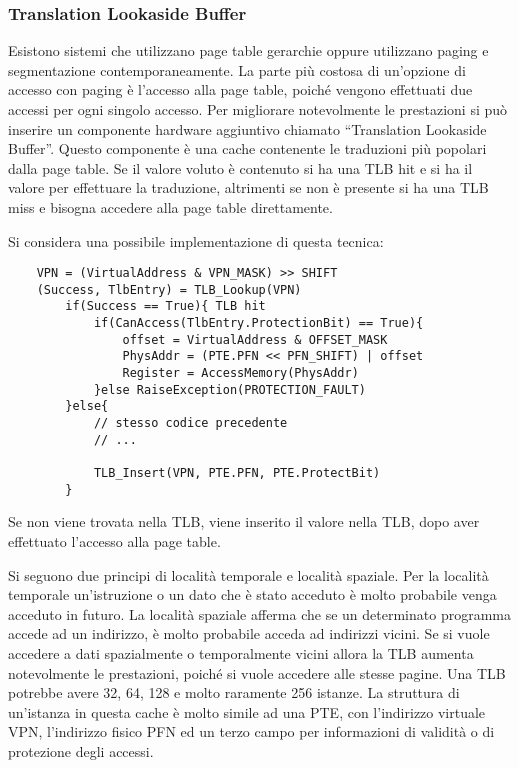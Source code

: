 \documentclass{article}
\numberwithin{equation}{subsection}
\begin{document}
\subsubsection{Translation Lookaside Buffer}

Esistono sistemi che utilizzano page table gerarchie oppure utilizzano paging e segmentazione contemporaneamente. 
La parte più costosa di un'opzione di accesso con paging è l'accesso alla page table, poiché vengono effettuati due accessi per ogni singolo accesso. 
Per migliorare notevolmente le prestazioni si può 
inserire un componente hardware aggiuntivo chiamato ``Translation Lookaside Buffer''. Questo componente è una cache contenente le traduzioni più popolari 
dalla page table. Se il valore voluto è contenuto si ha una TLB hit e si ha il valore per effettuare la traduzione, altrimenti se non è presente si ha una TLB miss 
e bisogna accedere alla page table direttamente. 


Si considera una possibile implementazione di questa tecnica: 
\begin{verbatim}
    VPN = (VirtualAddress & VPN_MASK) >> SHIFT
    (Success, TlbEntry) = TLB_Lookup(VPN)
        if(Success == True){ TLB hit
            if(CanAccess(TlbEntry.ProtectionBit) == True){
                offset = VirtualAddress & OFFSET_MASK
                PhysAddr = (PTE.PFN << PFN_SHIFT) | offset
                Register = AccessMemory(PhysAddr)
            }else RaiseException(PROTECTION_FAULT)
        }else{
            // stesso codice precedente
            // ...

            TLB_Insert(VPN, PTE.PFN, PTE.ProtectBit)
        }   
\end{verbatim}


Se non viene trovata nella TLB, viene inserito il valore nella TLB, dopo aver effettuato l'accesso alla page table. 

Si seguono due principi di località temporale e località spaziale. Per la località temporale un'istruzione o un dato che è stato acceduto è molto probabile venga 
acceduto in futuro. La località spaziale afferma che se un determinato programma accede ad un indirizzo, è molto probabile acceda ad indirizzi vicini. 
Se si vuole accedere a dati spazialmente o temporalmente vicini allora la TLB aumenta notevolmente le prestazioni, poiché si vuole accedere alle stesse pagine.  
Una TLB potrebbe avere 32, 64, 128 e molto raramente 256 istanze. 
La struttura di un'istanza in questa cache è molto simile ad una PTE, con l'indirizzo virtuale VPN, l'indirizzo fisico PFN ed un terzo campo per informazioni di validità o 
di protezione degli accessi. 
\end{document}
